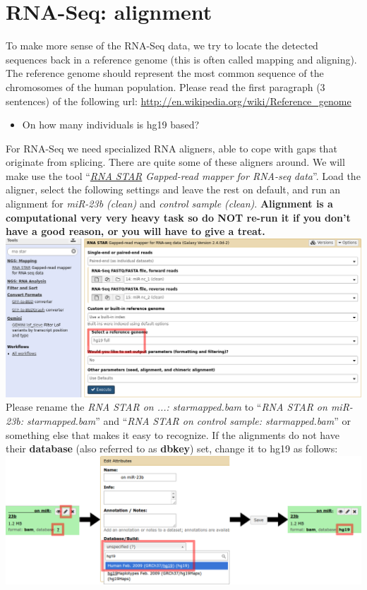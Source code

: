 \section{RNA-Seq: alignment}
To make more sense of the RNA-Seq data, we try to locate the detected sequences back in a reference genome (this is often called mapping and aligning).
The reference genome should represent the most common sequence of the chromosomes of the human population.
Please read the first paragraph (3 sentences) of the following url: \url{http://en.wikipedia.org/wiki/Reference_genome}
\begin{itemize}
	\item On how many individuals is hg19 based?
\end{itemize}
For RNA-Seq we need specialized RNA aligners, able to cope with gaps that originate from splicing.
There are quite some of these aligners around. We will make use the tool ``\textit{\underline{RNA STAR} Gapped-read mapper for RNA-seq data}''.
Load the aligner, select the following settings and leave the rest on default, and run an alignment for \textit{miR-23b (clean)} and \textit{control sample (clean)}. \textbf{Alignment is a computational very very heavy task so do NOT re-run it if you don't have a good reason, or you will have to give a treat.}\\
\includegraphics[width=\textwidth]{figures/alignment_01.png}\\
Please rename the \textit{RNA STAR on ...: starmapped.bam} to ``\textit{RNA STAR on miR-23b: starmapped.bam}'' and ``\textit{RNA STAR on control sample: starmapped.bam}'' or something else that makes it easy to recognize.
If the alignments do not have their \textbf{database} (also referred to as \textbf{dbkey}) set, change it to hg19 as follows:\\
\includegraphics[width=\textwidth]{figures/alignment_02.png}\\
